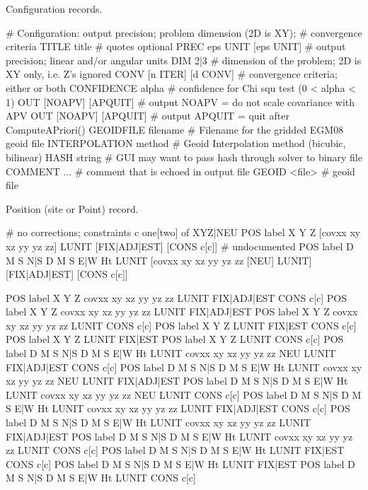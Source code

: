 Configuration records.
\begin{Snippet}
# Configuration: output precision; problem dimension (2D is XY);
#   convergence criteria
TITLE title # quotes optional
PREC  eps UNIT [eps UNIT] # output precision; linear and/or angular units
DIM 2|3  # dimension of the problem; 2D is XY only, i.e. Z's ignored
CONV [n ITER] [d CONV] # convergence criteria; either or both
CONFIDENCE alpha       # confidence for Chi squ test (0 < alpha < 1)
OUT [NOAPV] [APQUIT]   # output NOAPV = do not scale covariance with APV
OUT [NOAPV] [APQUIT]   # output APQUIT = quit after ComputeAPriori()
GEOIDFILE filename     # Filename for the gridded EGM08 geoid file
INTERPOLATION method   # Geoid Interpolation method (bicubic, bilinear)
HASH string            # GUI may want to pass hash through solver to binary file
COMMENT ...            # comment that is echoed in output file
GEOID <file>           # geoid file
\end{Snippet}

Position (site or Point) record.
\begin{Snippet}
# no corrections; constraints c one[two] of XYZ|NEU
POS label X Y Z [covxx xy xz yy yz zz] LUNIT [FIX|ADJ|EST] [CONS c[c]]
# undocumented
POS label D M S N|S D M S E|W Ht LUNIT [covxx xy xz yy yz zz [NEU] LUNIT]
         [FIX|ADJ|EST] [CONS c[c]]

POS label X Y Z covxx xy xz yy yz zz LUNIT FIX|ADJ|EST CONS c[c]
POS label X Y Z covxx xy xz yy yz zz LUNIT FIX|ADJ|EST
POS label X Y Z covxx xy xz yy yz zz LUNIT             CONS c[c]
POS label X Y Z LUNIT                      FIX|EST     CONS c[c]
POS label X Y Z LUNIT                      FIX|EST
POS label X Y Z LUNIT                                  CONS c[c]
POS label D M S N|S D M S E|W Ht LUNIT covxx xy xz yy yz zz NEU LUNIT FIX|ADJ|EST
         CONS c[c]
POS label D M S N|S D M S E|W Ht LUNIT covxx xy xz yy yz zz NEU LUNIT FIX|ADJ|EST
POS label D M S N|S D M S E|W Ht LUNIT covxx xy xz yy yz zz NEU LUNIT            
         CONS c[c]
POS label D M S N|S D M S E|W Ht LUNIT covxx xy xz yy yz zz     LUNIT FIX|ADJ|EST
         CONS c[c]
POS label D M S N|S D M S E|W Ht LUNIT covxx xy xz yy yz zz     LUNIT FIX|ADJ|EST
POS label D M S N|S D M S E|W Ht LUNIT covxx xy xz yy yz zz     LUNIT            
         CONS c[c]
POS label D M S N|S D M S E|W Ht LUNIT                                FIX|EST    
         CONS c[c]
POS label D M S N|S D M S E|W Ht LUNIT                                FIX|EST
POS label D M S N|S D M S E|W Ht LUNIT                                           
         CONS c[c]
\end{Snippet}

